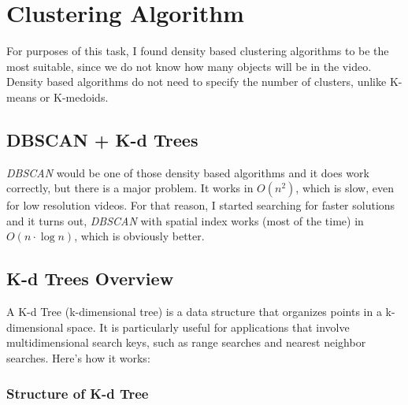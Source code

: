 \documentclass{article}
\begin{document}
	\newpage
	\section{Clustering Algorithm}
	
	For purposes of this task, I found density based clustering algorithms to be the most suitable, since we do not know how many objects will be in the video. Density based algorithms do not need to specify the number of clusters, unlike K-means or K-medoids. 


	\subsection{DBSCAN + K-d Trees}
	
	\textit{DBSCAN} would be one of those density based algorithms and it does work correctly, but there is a major problem. It works in $O(n^2)$, which is slow, even for low resolution videos. For that reason, I started searching for faster solutions and it turns out, \textit{DBSCAN} with spatial index works (most of the time) in $O(n \cdot \log n)$, which is obviously better.
	
	
	\subsection{K-d Trees Overview}
	
	A K-d Tree (k-dimensional tree) is a data structure that organizes points in a k-dimensional space. It is particularly useful for applications that involve multidimensional search keys, such as range searches and nearest neighbor searches. Here's how it works:
	
	\subsubsection{Structure of K-d Tree}
	
\end{document}
